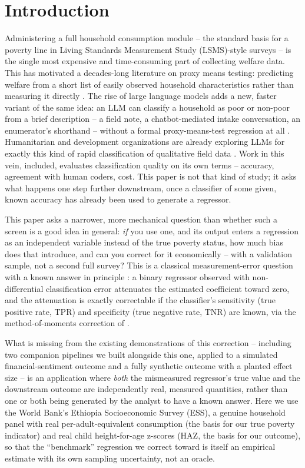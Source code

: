 \documentclass[12pt]{article}
\begin{document}
\doublespacing

\section{Introduction}
\label{sec:intro}

Administering a full household consumption module -- the standard basis for a poverty line in Living Standards Measurement Study (LSMS)-style surveys -- is the single most expensive and time-consuming part of collecting welfare data. This has motivated a decades-long literature on proxy means testing: predicting welfare from a short list of easily observed household characteristics rather than measuring it directly \citep{grosh1995proxy, brown2018poor}. The rise of large language models adds a new, faster variant of the same idea: an LLM can classify a household as poor or non-poor from a brief description -- a field note, a chatbot-mediated intake conversation, an enumerator's shorthand -- without a formal proxy-means-test regression at all \citep{gilardi2023chatgpt}. Humanitarian and development organizations are already exploring LLMs for exactly this kind of rapid classification of qualitative field data \citep{marston2026large}. Work in this vein, \citet{gilardi2023chatgpt} included, evaluates classification quality on its own terms -- accuracy, agreement with human coders, cost. This paper is not that kind of study; it asks what happens one step further downstream, once a classifier of some given, known accuracy has already been used to generate a regressor.

This paper asks a narrower, more mechanical question than whether such a screen is a good idea in general: \emph{if} you use one, and its output enters a regression as an independent variable instead of the true poverty status, how much bias does that introduce, and can you correct for it economically -- with a validation sample, not a second full survey? This is a classical measurement-error question with a known answer in principle \citep{aigner1973regression, bollinger1996bounding}: a binary regressor observed with non-differential classification error attenuates the estimated coefficient toward zero, and the attenuation is exactly correctable if the classifier's sensitivity (true positive rate, TPR) and specificity (true negative rate, TNR) are known, via the method-of-moments correction of \citet{rogan1978estimating}.

What is missing from the existing demonstrations of this correction -- including two companion pipelines we built alongside this one, applied to a simulated financial-sentiment outcome and a fully synthetic outcome with a planted effect size -- is an application where \emph{both} the mismeasured regressor's true value and the downstream outcome are independently real, measured quantities, rather than one or both being generated by the analyst to have a known answer. Here we use the World Bank's Ethiopia Socioeconomic Survey (ESS), a genuine household panel with real per-adult-equivalent consumption (the basis for our true poverty indicator) and real child height-for-age z-scores (HAZ, the basis for our outcome), so that the ``benchmark'' regression we correct toward is itself an empirical estimate with its own sampling uncertainty, not an oracle.
\end{document}
